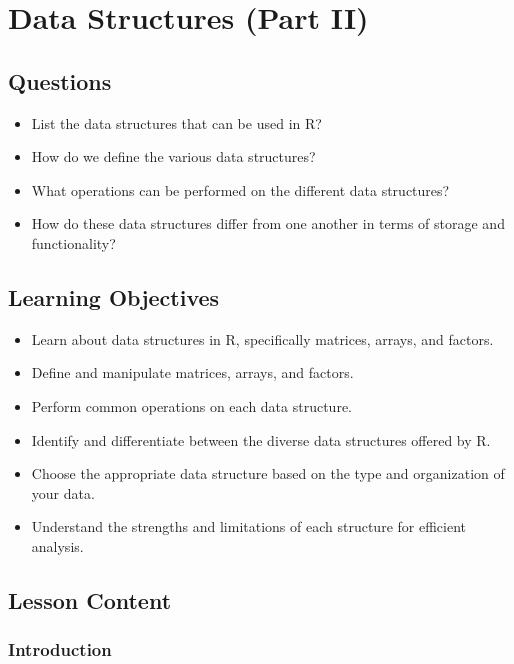 \documentclass[
  letterpaper,
  DIV=11,
  numbers=noendperiod]{scrreprt}
\begin{document}

\chapter{Data Structures (Part II)}\label{sec-data-structure-2}

\section{Questions}\label{questions-10}

\begin{itemize}
\item
  List the data structures that can be used in R?
\item
  How do we define the various data structures?
\item
  What operations can be performed on the different data structures?
\item
  How do these data structures differ from one another in terms of
  storage and functionality?
\end{itemize}

\section{Learning Objectives}\label{learning-objectives-10}

\begin{itemize}
\item
  Learn about data structures in R, specifically matrices, arrays, and
  factors.
\item
  Define and manipulate matrices, arrays, and factors.
\item
  Perform common operations on each data structure.
\item
  Identify and differentiate between the diverse data structures offered
  by R.
\item
  Choose the appropriate data structure based on the type and
  organization of your data.
\item
  Understand the strengths and limitations of each structure for
  efficient analysis.
\end{itemize}

\section{Lesson Content}\label{lesson-content-10}

\subsection{Introduction}\label{introduction-8}
\end{document}
